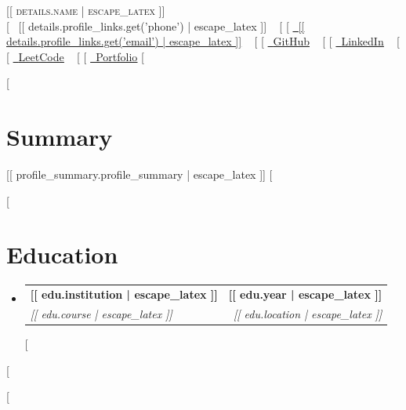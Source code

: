 \documentclass[letterpaper,11pt]{article}
\makeatletter
\newcommand{\resumeSubheading}[4]{
  \vspace{-2pt}\item
    \begin{tabular*}{1.0\textwidth}[t]{l@{\extracolsep{\fill}}r}
      \textbf{#1} & \textbf{\small #2} \\
      \textit{\small#3} & \textit{\small #4} \\
    \end{tabular*}\vspace{-7pt}
}
\newcommand{\resumeSubHeadingListStart}{\begin{itemize}[leftmargin=0.0in, label={}]}
\newcommand{\resumeSubHeadingListEnd}{\end{itemize}}
\makeatother
\begin{document}
\begin{center}
    {\Huge \scshape [[ details.name | escape_latex ]]} \\ \vspace{1pt}
    \small 
    [%
    \raisebox{-0.1\height}\faPhone\ [[ details.profile_links.get('phone') | escape_latex ]] ~
    [%
    [%
    \href{mailto:[[ details.profile_links.get('email') | escape_latex ]]}{\raisebox{-0.2\height}\faEnvelope\ \underline{[[ details.profile_links.get('email') | escape_latex ]]}} ~
    [%
    [%
    \href{[[ details.profile_links.get('github') | escape_latex ]]}{\raisebox{-0.2\height}\faGithub\ \underline{GitHub}} ~
    [%
    [%
    \href{[[ details.profile_links.get('linkedin') | escape_latex ]]}{\raisebox{-0.2\height}\faLinkedin\ \underline{LinkedIn}} ~
    [%
    [%
    \href{[[ details.profile_links.get('leetcode') | escape_latex ]]}{\raisebox{-0.2\height}\faCode\ \underline{LeetCode}} ~
    [%
    [%
    \href{[[ details.profile_links.get('portfolio') | escape_latex ]]}{\raisebox{-0.2\height}\faGlobe\ \underline{Portfolio}}
    [%
    \vspace{-8pt}
\end{center}

[%
\section{Summary}
\small [[ profile_summary.profile_summary | escape_latex ]]
\vspace{-10pt}
[%

[%
\section{Education}
  \resumeSubHeadingListStart
    [%
    \resumeSubheading
      {[[ edu.institution | escape_latex ]]}{[[ edu.year | escape_latex ]]}
      {[[ edu.course | escape_latex ]]}{[[ edu.location | escape_latex ]]}
    [%
  \resumeSubHeadingListEnd
[%

[%
\end{document}
